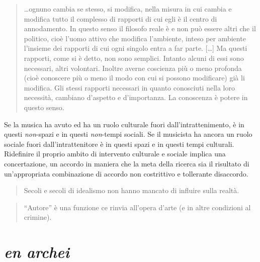 \documentclass{../../lib/gs}
\begin{document}
\begin{quote}
  \ldots ognuno cambia se stesso, si modifica, nella misura in cui cambia e
  modifica tutto il complesso di rapporti di cui egli è il centro di annodamento.
  In questo senso il filosofo reale è e non può essere altri che il politico,
  cioè l'uomo attivo che modifica l'ambiente, inteso per ambiente l'insieme dei
  rapporti di cui ogni singolo entra a far parte. %
  [\ldots] Ma questi rapporti, come si è detto, non sono semplici. Intanto
  alcuni di essi sono necessari, altri volontari. Inoltre averne coscienza più
  o meno profonda (cioè conoscere più o meno il modo con cui si possono
  modificare) già li modifica. Gli stessi rapporti necessari in quanto
  conosciuti nella loro necessità, cambiano d'aspetto e d'importanza.
  La conoscenza è potere in questo senso. \cite{ag:matst}
\end{quote}%

Se la musica ha avuto ed ha un ruolo culturale fuori dall'intrattenimento, è
in questi \emph{non}-spazi e in questi \emph{non}-tempi sociali. Se il musicista
ha ancora un ruolo sociale fuori dall'intrattenitore è in questi spazi e in
questi tempi culturali. Ridefinire il proprio ambito di intervento culturale e
sociale implica una concertazione, un accordo in maniera che la meta della
ricerca sia il risultato di un’appropriata combinazione di accordo non
costrittivo e tollerante disaccordo.

\begin{quote}
  Secoli e secoli di idealismo non hanno mancato di influire sulla realtà. \cite{jlb:finzioni}
\end{quote}%

\begin{quote}
\begin{sf}
\small
  “Autore” è una funzione ce rinvia all'opera d'arte (e in altre condizioni al
  crimine).
  \cite{deleuze2009}
  \end{sf}
\end{quote}

\clearpage
\section{\emph{en archei}}
\end{document}
